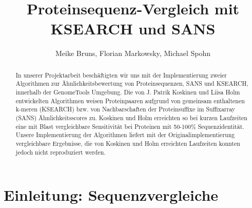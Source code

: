 \documentclass{article}
\title{Proteinsequenz-Vergleich mit KSEARCH und SANS}
\author{Meike Bruns, Florian Markowsky, Michael Spohn}
\begin{document}
\maketitle
\thispagestyle{empty}
\begin{abstract}
In unserer Projektarbeit beschäftigten wir uns mit der Implementierung zweier Algorithmen zur Ähnlichkeitsbewertung von Proteinsequenzen, SANS und KSEARCH, innerhalb der GenomeTools Umgebung. Die von J. Patrik Koskinen und Liisa Holm entwickelten Algorithmen weisen Proteinpaaren aufgrund von gemeinsam enthaltenen k-meren (KSEARCH) bzw. von Nachbarschaften der Proteinsuffixe im Suffixarray (SANS) Ähnlichkeitsscores zu. Koskinen und Holm erreichten so bei kurzen Laufzeiten eine mit Blast vergleichbare Sensitivität bei Proteinen mit 50-100\% Sequenzidentität. Unsere Implementierung der Algorithmen liefert mit der Originalimplementierung vergleichbare Ergebnisse, die von Koskinen und Holm erreichten Laufzeiten konnten jedoch nicht reproduziert werden.
\end{abstract}
\newpage

\tableofcontents
\thispagestyle{empty}
\newpage

\section{Einleitung: Sequenzvergleiche}
\end{document}
